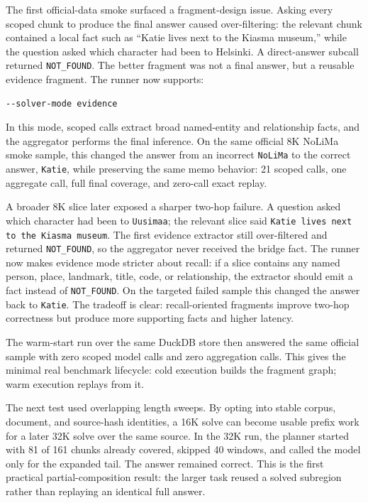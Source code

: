 \documentclass[11pt]{article}
\begin{document}
The first official-data smoke surfaced a fragment-design issue. Asking every
scoped chunk to produce the final answer caused over-filtering: the relevant
chunk contained a local fact such as ``Katie lives next to the Kiasma museum,''
while the question asked which character had been to Helsinki. A direct-answer
subcall returned \texttt{NOT\_FOUND}. The better fragment was not a final
answer, but a reusable evidence fragment. The runner now supports:

\begin{verbatim}
--solver-mode evidence
\end{verbatim}

In this mode, scoped calls extract broad named-entity and relationship facts,
and the aggregator performs the final inference. On the same official 8K
NoLiMa smoke sample, this changed the answer from an incorrect \texttt{NoLiMa}
to the correct answer, \texttt{Katie}, while preserving the same memo behavior:
21 scoped calls, one aggregate call, full final coverage, and zero-call exact
replay.

A broader 8K slice later exposed a sharper two-hop failure. A question asked
which character had been to \texttt{Uusimaa}; the relevant slice said
\texttt{Katie lives next to the Kiasma museum}. The first evidence extractor
still over-filtered and returned \texttt{NOT\_FOUND}, so the aggregator never
received the bridge fact. The runner now makes evidence mode stricter about
recall: if a slice contains any named person, place, landmark, title, code, or
relationship, the extractor should emit a fact instead of \texttt{NOT\_FOUND}.
On the targeted failed sample this changed the answer back to
\texttt{Katie}. The tradeoff is clear: recall-oriented fragments improve
two-hop correctness but produce more supporting facts and higher latency.

The warm-start run over the same DuckDB store then answered the same official
sample with zero scoped model calls and zero aggregation calls. This gives the
minimal real benchmark lifecycle: cold execution builds the fragment graph;
warm execution replays from it.

The next test used overlapping length sweeps. By opting into stable corpus,
document, and source-hash identities, a 16K solve can become usable prefix work
for a later 32K solve over the same source. In the 32K run, the planner started
with 81 of 161 chunks already covered, skipped 40 windows, and called the model
only for the expanded tail. The answer remained correct. This is the first
practical partial-composition result: the larger task reused a solved subregion
rather than replaying an identical full answer.
\end{document}
